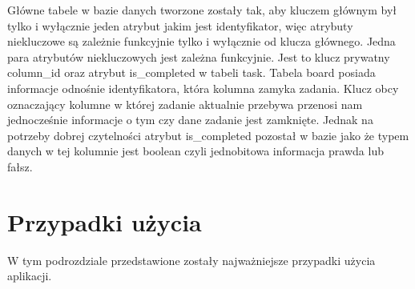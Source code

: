 Główne tabele w bazie danych tworzone zostały tak, aby kluczem głównym był tylko i wyłącznie jeden atrybut jakim jest identyfikator, więc atrybuty niekluczowe są zależnie funkcyjnie tylko i wyłącznie od klucza głównego. Jedna para atrybutów niekluczowych jest zależna funkcyjnie. Jest to klucz prywatny column\_id oraz atrybut is\_completed w tabeli task. Tabela board posiada informacje odnośnie identyfikatora, która kolumna zamyka zadania. Klucz obcy oznaczający kolumne w której zadanie aktualnie przebywa przenosi nam jednocześnie informacje o tym czy dane zadanie jest zamknięte. Jednak na potrzeby dobrej czytelności atrybut is\_completed pozostał w bazie jako że typem danych w tej kolumnie  jest boolean czyli jednobitowa informacja prawda lub fałsz.
\clearpage
\section{Przypadki użycia}

W tym podrozdziale przedstawione zostały najważniejsze przypadki użycia aplikacji.


